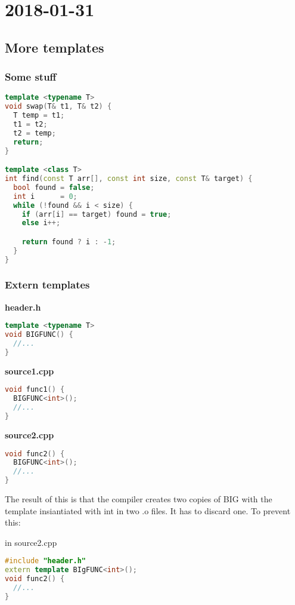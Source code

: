 \section{2018-01-31}

\subsection{More templates}

\subsubsection{Some stuff}

\begin{lstlisting}[language=C++]
template <typename T>
void swap(T& t1, T& t2) {
  T temp = t1;
  t1 = t2;
  t2 = temp;
  return;
}

template <class T>
int find(const T arr[], const int size, const T& target) {
  bool found = false;
  int i      = 0;
  while (!found && i < size) {
    if (arr[i] == target) found = true;
    else i++;

    return found ? i : -1;
  }
}
\end{lstlisting}


\subsubsection{Extern templates}

\textbf{header.h}

\begin{lstlisting}[language=C++]
template <typename T>
void BIGFUNC() {
  //...
}
\end{lstlisting}

\textbf{source1.cpp}

\begin{lstlisting}[language=C++]
void func1() {
  BIGFUNC<int>();  
  //...
}
\end{lstlisting}

\textbf{source2.cpp}

\begin{lstlisting}[language=C++]
void func2() {
  BIGFUNC<int>();  
  //...
}
\end{lstlisting}

The result of this is that the compiler creates two copies of BIG with the template insiantiated with int in two .o files. It has to discard one. To prevent this:

in source2.cpp

\begin{lstlisting}[language=C++]
#include "header.h"
extern template BIgFUNC<int>();
void func2() {
  //...
}
\end{lstlisting}


